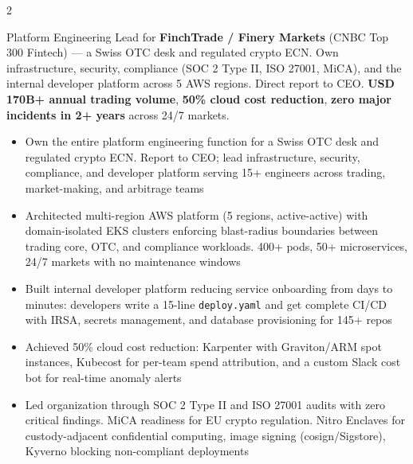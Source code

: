 \documentclass[10pt,a4paper,ragged2e,withhyper]{altacv}
\begin{document}


\makecvheader



\begin{paracol}{2}



\small Platform Engineering Lead for \textbf{FinchTrade / Finery Markets} (CNBC Top 300 Fintech) --- a Swiss OTC desk and regulated crypto ECN. Own infrastructure, security, compliance (SOC 2 Type II, ISO 27001, MiCA), and the internal developer platform across 5 AWS regions. Direct report to CEO. \textbf{USD 170B+ annual trading volume}, \textbf{50\% cloud cost reduction}, \textbf{zero major incidents in 2+ years} across 24/7 markets.


\begin{itemize}
\item Own the entire platform engineering function for a Swiss OTC desk and regulated crypto ECN. Report to CEO; lead infrastructure, security, compliance, and developer platform serving 15+ engineers across trading, market-making, and arbitrage teams
\item Architected multi-region AWS platform (5 regions, active-active) with domain-isolated EKS clusters enforcing blast-radius boundaries between trading core, OTC, and compliance workloads. 400+ pods, 50+ microservices, 24/7 markets with no maintenance windows
\item Built internal developer platform reducing service onboarding from days to minutes: developers write a 15-line \texttt{deploy.yaml} and get complete CI/CD with IRSA, secrets management, and database provisioning for 145+ repos
\item Achieved 50\% cloud cost reduction: Karpenter with Graviton/ARM spot instances, Kubecost for per-team spend attribution, and a custom Slack cost bot for real-time anomaly alerts
\item Led organization through SOC 2 Type II and ISO 27001 audits with zero critical findings. MiCA readiness for EU crypto regulation. Nitro Enclaves for custody-adjacent confidential computing, image signing (cosign/Sigstore), Kyverno blocking non-compliant deployments
\end{itemize}


\end{paracol}
\end{document}
